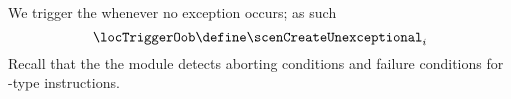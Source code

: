 We trigger the \oobMod{} whenever no exception occurs; as such
\[
	\locTriggerOob \define \scenCreateUnexceptional _{i}
\]
\saNote{} Recall that the the \oobMod{} module detects aborting conditions and failure conditions for -type instructions. 
